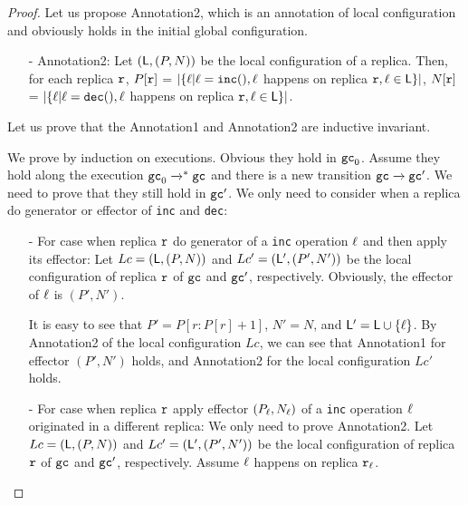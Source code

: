 \begin {proof}


Let us propose Annotation2, which is an annotation of local configuration and obviously holds in the initial global configuration.

\begin{itemize}
\setlength{\itemsep}{0.5pt}
\item[-] Annotation2: Let $(\alabelset,(P,N))$ be the local configuration of a replica. Then, for each replica $\arep$, $P[\arep]$ =  $\vert \{ \alabel \vert \alabel = \alabelshort[{\tt inc}]{}, \alabel$ happens on replica $\arep, \alabel \in \alabelset \} \vert$,
    $N[\arep]$ =  $\vert \{ \alabel \vert \alabel = \alabelshort[{\tt dec}]{}, \alabel$ happens on replica $\arep, \alabel \in \alabelset \} \vert$.
\end{itemize}


Let us prove that the Annotation1 and Annotation2 are inductive invariant.

We prove by induction on executions. Obvious they hold in $\aglobalstate_0$. Assume they hold along the execution $\aglobalstate_0 \xrightarrow{}^* \aglobalstate$ and there is a new transition $\aglobalstate \xrightarrow{} \aglobalstate'$. We need to prove that they still hold in $\aglobalstate'$. We only need to consider when a replica do generator or effector of {\tt inc} and {\tt dec}:

\begin{itemize}
\setlength{\itemsep}{0.5pt}
\item[-] For case when replica $\arep$ do generator of a {\tt inc} operation $\alabel$ and then apply its effector: %
    Let $Lc = (\alabelset,(P,N))$ and $Lc' = (\alabelset',(P',N'))$ be the local configuration of replica $\arep$ of $\aglobalstate$ and $\aglobalstate'$, respectively. Obviously, the effector of $\alabel$ is $(P',N')$.

    It is easy to see that $P'=P[r:P[r]+1]$, $N'=N$, and $\alabelset' = \alabelset \cup \{ \alabel \}$. By Annotation2 of the local configuration $Lc$, we can see that Annotation1 for effector $(P',N')$ holds, and Annotation2 for the local configuration $Lc'$ holds.

\item[-] For case when replica $\arep$ apply effector $(P_{\alabel},N_{\alabel})$ of a {\tt inc} operation $\alabel$ originated in a different replica: We only need to prove Annotation2. Let $Lc = (\alabelset,(P,N))$ and $Lc' = (\alabelset',(P',N'))$ be the local configuration of replica $\arep$ of $\aglobalstate$ and $\aglobalstate'$, respectively. Assume $\alabel$ happens on replica $\arep_{\alabel}$.


\end{itemize}
\end{proof}
